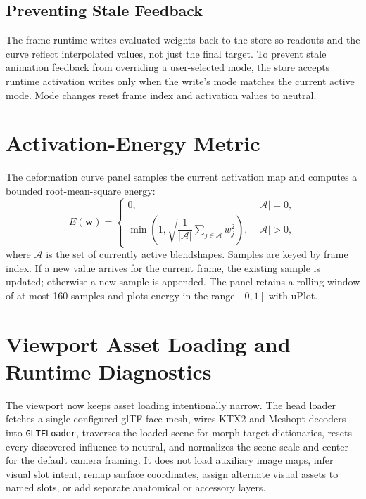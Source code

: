 \documentclass[11pt]{article}
\newcommand{\code}[1]{\texttt{#1}}
\begin{document}
\subsection{Preventing Stale Feedback}
The frame runtime writes evaluated weights back to the store so readouts and the curve reflect interpolated values, not just the final target.  To prevent stale animation feedback from overriding a user-selected mode, the store accepts runtime activation writes only when the write's mode matches the current active mode.  Mode changes reset frame index and activation values to neutral.

\section{Activation-Energy Metric}

The deformation curve panel samples the current activation map and computes a bounded root-mean-square energy:
\begin{equation}
  E(\mathbf{w}) =
  \begin{cases}
    0, & |\mathcal{A}|=0,\\
    \min\left(1,\sqrt{\dfrac{1}{|\mathcal{A}|}\sum_{j\in\mathcal{A}} w_j^2}\right), & |\mathcal{A}|>0,
  \end{cases}
  \label{eq:activation-energy}
\end{equation}
where $\mathcal{A}$ is the set of currently active blendshapes.  Samples are keyed by frame index.  If a new value arrives for the current frame, the existing sample is updated; otherwise a new sample is appended.  The panel retains a rolling window of at most 160 samples and plots energy in the range $[0,1]$ with uPlot.


\section{Viewport Asset Loading and Runtime Diagnostics}

The viewport now keeps asset loading intentionally narrow.  The head loader fetches a single configured glTF face mesh, wires KTX2 and Meshopt decoders into \code{GLTFLoader}, traverses the loaded scene for morph-target dictionaries, resets every discovered influence to neutral, and normalizes the scene scale and center for the default camera framing.  It does not load auxiliary image maps, infer visual slot intent, remap surface coordinates, assign alternate visual assets to named slots, or add separate anatomical or accessory layers.
\end{document}
